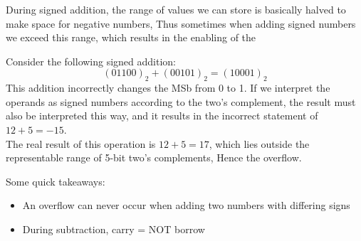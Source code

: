 \documentclass[]{report}
\newcommand{\keyword}[1]{{{\color{kwcol}{\hl{#1}}\,}}}
\begin{document}
During signed addition, the range of values we can store is basically halved to make space for negative numbers, Thus sometimes when adding signed numbers we exceed this range, which results in the enabling of the \keyword{overflow flag}

\begin{remark}
	Consider the following signed addition:
	\[	(01100)_2 + (00101)_2 = (10001)_2	\]
	This addition incorrectly changes the MSb from 0 to 1. If we interpret the operands as signed numbers according to the two's complement, the result must also be interpreted this way, and it results in the incorrect statement of $12+5=-15$.\\
	
	The real result of this operation is $12+5=17$, which lies outside the representable range of 5-bit two's complements, Hence the overflow.
\end{remark}

Some quick takeaways:
\begin{itemize}
	\item An overflow can never occur when adding two numbers with differing signs
	\item During subtraction, carry = NOT borrow
\end{itemize}
\end{document}
